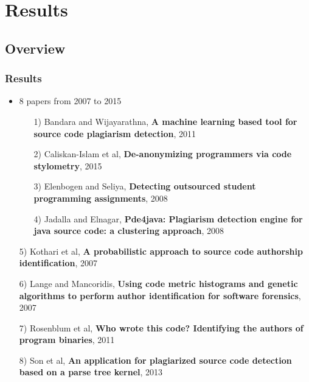 \documentclass[t,12pt,pdftex]{beamer}
\begin{document}
\section{Results}
\subsection{Overview}
\begin{frame}
	\frametitle{Results}
	\begin{itemize}
		\item 8 papers from 2007 to 2015
		\begin{itemize}
			\item[1)] Bandara and Wijayarathna, \textbf{A machine learning based tool
for source code plagiarism detection}, 2011
			\item[2)] Caliskan-Islam et al, \textbf{De-anonymizing
programmers via code stylometry}, 2015
			\item[3)] Elenbogen and Seliya, \textbf{Detecting outsourced student
programming assignments}, 2008
			\item[4)] Jadalla and Elnagar, \textbf{Pde4java: Plagiarism detection
engine for java source code: a clustering approach}, 2008
		\end{itemize}
	\end{itemize}
\end{frame}

\begin{frame}
	\vspace{0.5in}
	\begin{itemize}
	\item[5)] Kothari et al, \textbf{A probabilistic approach to source code authorship identification}, 2007
			\item[6)] Lange and Mancoridis, \textbf{Using code metric histograms and genetic algorithms to perform author identification for software forensics}, 2007
			\item[7)] Rosenblum et al, \textbf{Who wrote
this code? Identifying the authors of program binaries}, 2011
			\item[8)] Son et al, \textbf{An application for plagiarized source code detection based on a parse
tree kernel}, 2013
	\end{itemize}
\end{frame}
\end{document}
